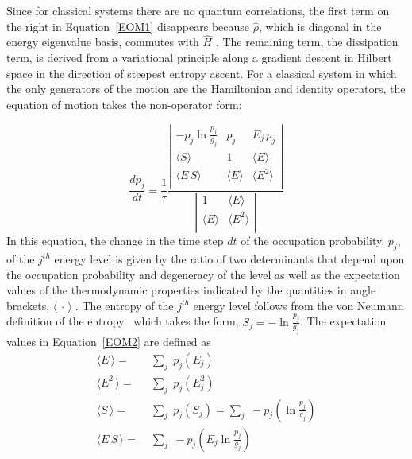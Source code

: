 \documentclass[
journal=jcisd8, %
manuscript=article,
layout=twocolumn   %
]{achemso}
\begin{document}
Since for classical systems there are no quantum correlations, the first term on the right in Equation~\ref{EOM1} disappears because $\hat{\rho}$, which is diagonal in the energy eigenvalue basis, commutes with $\hat{H}$ \cite{Li2016a,Li2016b,Li2018,Beretta2006,Beretta2009,Li2016d}. The remaining term, the dissipation term, is derived from a variational principle along a gradient descent in Hilbert space in the direction of steepest entropy ascent. For a classical system in which the only generators of the motion are the Hamiltonian and identity operators, the equation of motion takes the non-operator form: \cite{Beretta1984, Beretta1985, Li2016d}


\begin{equation}
\frac{dp_j}{dt}=\frac {1} {\tau}\frac{\left|
\begin{array}{ccc}
 -p_j \ln \frac{p_j}{g_j} & p_j & {E}_j\, p_j \\
 \langle S \rangle & 1 & \langle E \rangle \\
 \langle E\,S \rangle & \langle E \rangle & \langle E^2 \rangle \\
\end{array}
\right|}{\left|
\begin{array}{cc}
 1 & \langle E \rangle \\
  \langle E \rangle & \langle E^2 \rangle \\
\end{array}
\right|} 
\label{EOM2}
\end{equation}
In this equation, the change in the time step $dt$ of the occupation probability, $p_j$, of the $j^{th}$ energy level is given by the ratio of two determinants that depend upon the occupation probability and degeneracy of the level as well as the expectation values of the thermodynamic properties indicated by the quantities in angle brackets, $\langle \, \cdot \, \rangle\;$.  The entropy of the $j^{th}$ energy level follows from the von Neumann definition of the entropy~\cite{Gyftopoulos1997} which takes the form, $S_j = -\ln \frac{p_j}{g_j}$. The expectation values in Equation~\ref{EOM2} are defined as
\begin {align}
\langle E\, \rangle =&\; \underset {j} {{\sum}}\phantom{l} p_j(E_{j}) \label{ExpectationE} \\
\langle E^2\, \rangle =&\; \underset {j} {{\sum}}\phantom{l} p_j(E_{j}^{2})  \\
\langle S\, \rangle =&\; \underset {j} {{\sum}}\phantom{l} p_j(S_{j}) = \underset {j} {{\sum}}\phantom{l} - p_j( \ln \frac{p_j}{g_j}) \label{ExpectationS} \\
\langle E\,S\, \rangle =&\; \underset {j} {{\sum}}\phantom{l} - p_j(E_j \ln \frac{p_j}{g_j}) \label{ExpectationValues}
\end {align}
\end{document}

